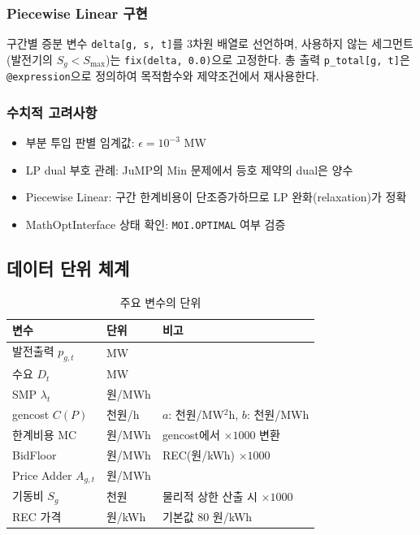 \documentclass[11pt, a4paper]{article}
\begin{document}
\subsubsection{Piecewise Linear 구현}

구간별 증분 변수 \texttt{delta[g, s, t]}를 3차원 배열로 선언하며,
사용하지 않는 세그먼트(발전기의 $S_g < S_{\max}$)는 \texttt{fix(delta, 0.0)}으로 고정한다.
총 출력 \texttt{p\_total[g, t]}은 \texttt{@expression}으로 정의하여
목적함수와 제약조건에서 재사용한다.

\subsubsection{수치적 고려사항}

\begin{itemize}[noitemsep]
    \item 부분 투입 판별 임계값: $\epsilon = 10^{-3}$ MW
    \item LP dual 부호 관례: JuMP의 Min 문제에서 등호 제약의 dual은 양수
    \item Piecewise Linear: 구간 한계비용이 단조증가하므로 LP 완화(relaxation)가 정확
    \item MathOptInterface 상태 확인: \texttt{MOI.OPTIMAL} 여부 검증
\end{itemize}

\subsection{데이터 단위 체계}

\begin{table}[H]
\centering
\caption{주요 변수의 단위}\label{tab:units}
\begin{tabular}{lll}
\toprule
\textbf{변수} & \textbf{단위} & \textbf{비고} \\
\midrule
발전출력 $p_{g,t}$     & MW     & \\
수요 $D_t$             & MW     & \\
SMP $\lambda_t$        & 원/MWh & \\
gencost $C(P)$         & 천원/h & $a$: 천원/MW$^2$h, $b$: 천원/MWh \\
한계비용 MC             & 원/MWh & gencost에서 $\times 1000$ 변환 \\
BidFloor               & 원/MWh & REC(원/kWh) $\times 1000$ \\
Price Adder $A_{g,t}$  & 원/MWh & \\
기동비 $S_g$           & 천원   & 물리적 상한 산출 시 $\times 1000$ \\
REC 가격               & 원/kWh & 기본값 80 원/kWh \\
\bottomrule
\end{tabular}
\end{table}
\end{document}
